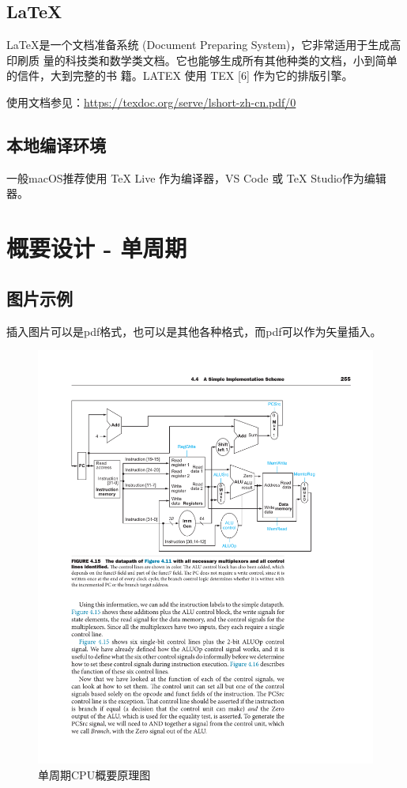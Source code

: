 \documentclass[UTF8,a4paper,autofakebold,15pt]{ctexart}
\begin{document}
\subsection{\LaTeX}
	\LaTeX 是一个文档准备系统 (Document Preparing System)，它非常适用于生成高印刷质 量的科技类和数学类文档。它也能够生成所有其他种类的文档，小到简单的信件，大到完整的书 籍。LATEX 使用 TEX [6] 作为它的排版引擎。

	使用文档参见：\href{https://texdoc.org/serve/lshort-zh-cn.pdf/0}{https://texdoc.org/serve/lshort-zh-cn.pdf/0}

\subsection{本地编译环境}

	一般macOS推荐使用 TeX Live 作为编译器，VS Code 或 TeX Studio作为编辑器。

\newpage

\section{概要设计 - 单周期}

\subsection{图片示例}

插入图片可以是pdf格式，也可以是其他各种格式，而pdf可以作为矢量插入。

\begin{figure}[ht]
	\centering
	\includegraphics{fig1.pdf}
	\caption{单周期CPU概要原理图\cite{ref1}}
	\label{fig:label1}
\end{figure}
\end{document}
